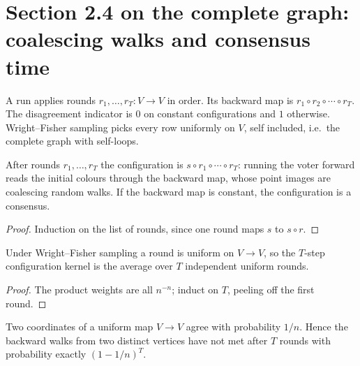 \section{Section 2.4 on the complete graph: coalescing walks and consensus time}
\begin{definition}\label{def:backward}
\leanok{}
A run applies rounds $r_1,\dots,r_T\colon V\to V$ in order. Its backward map is
$r_1\circ r_2\circ\cdots\circ r_T$. The disagreement indicator is $0$ on constant
configurations and $1$ otherwise. Wright--Fisher sampling picks every row uniformly
on $V$, self included, i.e.\ the complete graph with self-loops.
\end{definition}
\begin{lemma}\label{lem:duality}
\leanok{}
After rounds $r_1,\dots,r_T$ the configuration is $s\circ r_1\circ\cdots\circ r_T$:
running the voter forward reads the initial colours through the backward map, whose
point images are coalescing random walks. If the backward map is constant, the
configuration is a consensus.
\end{lemma}
\begin{proof}\leanok
Induction on the list of rounds, since one round maps $s$ to $s\circ r$.
\end{proof}
\begin{lemma}\label{lem:wf-rounds}
\leanok{}
Under Wright--Fisher sampling a round is uniform on $V\to V$, so the $T$-step
configuration kernel is the average over $T$ independent uniform rounds.
\end{lemma}
\begin{proof}\leanok
The product weights are all $n^{-n}$; induct on $T$, peeling off the first round.
\end{proof}
\begin{lemma}\label{lem:meeting}
\leanok{}
Two coordinates of a uniform map $V\to V$ agree with probability $1/n$. Hence the
backward walks from two distinct vertices have not met after $T$ rounds with
probability exactly $(1-1/n)^T$.
\end{lemma}
